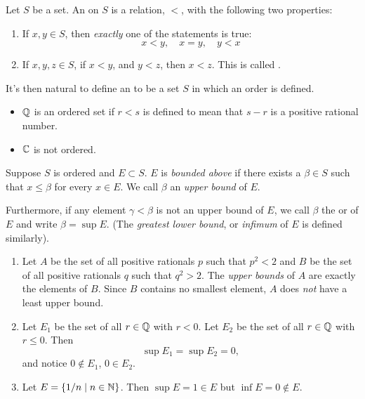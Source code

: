 \documentclass{article}
\begin{document}
\begin{definition}
    Let $S$ be a set. An  on $S$ is a relation, $<$, with the following two properties:
    \begin{enumerate}
        \item If $x,y\in S$, then \emph{exactly} one of the statements is true:
        \[x<y,\quad x=y,\quad y<x\]
        \item If $x,y,z\in S$, if $x<y$, and $y<z$, then $x<z$. This is called .
    \end{enumerate}
    It's then natural to define an  to be a set $S$ in which an order is defined. 
\end{definition}
\begin{example}
\listhack
    \begin{itemize}
        \item $\mathbb Q$ is an ordered set if $r<s$ is defined to mean that $s-r$ is a positive rational number.
        \item $\mathbb C$ is not ordered.
    \end{itemize}
\end{example}

\begin{definition}
    Suppose $S$ is ordered and $E\subset S$. $E$ is \emph{bounded above} if there exists a $\beta\in S$ such that $x\leq \beta$ for every $x\in E$. We call $\beta$ an \emph{upper bound} of $E$. 
    
    Furthermore, if any element $\gamma<\beta$ is not an upper bound of $E$, we call $\beta$ the  or  of $E$ and write $\beta=\sup{E}$. (The \emph{greatest lower bound}, or \emph{infimum} of $E$ is defined similarly).
\end{definition}
\begin{example}
    \listhack
    \begin{enumerate}
        \item Let $A$ be the set of all positive rationals $p$ such that $p^2<2$ and $B$ be the set of all positive rationals $q$ such that $q^2>2$. The \emph{upper bounds} of $A$ are exactly the elements of $B$.  Since $B$ contains no smallest element, $A$ does \emph{not} have a least upper bound.
        \item Let $E_{1}$ be the set of all $r\in \mathbb Q$ with $r<0$. Let $E_{2}$ be the set of all $r\in \mathbb Q$ with $r\leq 0$. Then \[\sup{E_{1}}=\sup{E_{2}}=0,\]and notice $0\not\in E_{1}$, $0\in E_{2}$.
        \item Let $E=\{1/n\mid n\in\mathbb N\}$. Then $\sup{E}=1\in E$ but $\inf{E}=0\not\in E$.
    \end{enumerate}
\end{example}
\end{document}
